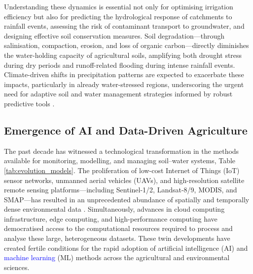 \documentclass[land,article,submit,pdftex,moreauthors]{Definitions/mdpi}
\numberwithin{equation}{section}
\begin{document}
Understanding these dynamics is essential not only for optimising irrigation efficiency but also for predicting the hydrological response of catchments to rainfall events, assessing the risk of contaminant transport to groundwater, and designing effective soil conservation measures. Soil degradation---through salinisation, compaction, erosion, and loss of organic carbon---directly diminishes the water-holding capacity of agricultural soils, amplifying both drought stress during dry periods and runoff-related flooding during intense rainfall events. Climate-driven shifts in precipitation patterns are expected to exacerbate these impacts, particularly in already water-stressed regions, underscoring the urgent need for adaptive soil and water management strategies informed by robust predictive tools \citep{lehmann2020soil}.

\subsection{Emergence of AI and Data-Driven Agriculture}

The past decade has witnessed a technological transformation in the methods available for monitoring, modelling, and managing soil--water systems, Table \ref{tab:evolution_models}. The proliferation of low-cost Internet of Things (IoT) sensor networks, unmanned aerial vehicles (UAVs), and high-resolution satellite remote sensing platforms---including Sentinel-1/2, Landsat-8/9, MODIS, and SMAP---has resulted in an unprecedented abundance of spatially and temporally dense environmental data \citep{ran}. Simultaneously, advances in cloud computing infrastructure, edge computing, and high-performance computing have democratised access to the computational resources required to process and analyse these large, heterogeneous datasets. These twin developments have created fertile conditions for the rapid adoption of artificial intelligence (AI) and \textcolor{blue}{machine learning} (ML) methods across the agricultural and environmental sciences.
\end{document}
